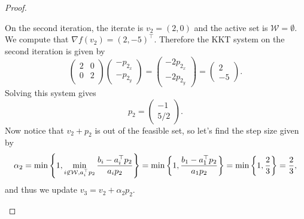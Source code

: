 \documentclass[12pt]{report}
\begin{document}
\begin{problem}
\begin{proof}
\begin{enumerate}
    On the second iteration, the iterate is $v_2 = (2,0)$ and the active set is $\mathcal{W} = \emptyset$. We compute that $\nabla f(v_2) = (2,-5)^\top$. Therefore the KKT system on the second iteration is given by
    \begin{equation*}
        \begin{pmatrix}
            2 & 0 \\
            0 & 2 \\
        \end{pmatrix}\begin{pmatrix}
            -p_{2_x}\\-p_{2_y}
        \end{pmatrix} = \begin{pmatrix}
            -2p_{2_x}\\-2p_{2_y}
        \end{pmatrix}= \begin{pmatrix}
            2 \\ -5
        \end{pmatrix}.
    \end{equation*}
    Solving this system gives
    \begin{equation*}
        p_2 = \begin{pmatrix}
            -1 \\ 5/2
        \end{pmatrix}.
    \end{equation*}
    Now notice that $v_2 + p_2$ is out of the feasible set, so let's find the step size given by
    \begin{equation*}
        \alpha_2 = \min{\left\{1,\min_{i\not\in\mathcal{W},a_i^\top p_2}\frac{b_i - a_i^\top p_2}{a_i p_2}\right\}} = \min{\left\{1,\frac{b_1 - a_1^\top p_2}{a_1 p_2}\right\}} = \min {\left\{1, \frac{2}{3}\right\}} = \frac{2}{3},
    \end{equation*} 
    and thus we update $v_3 = v_2 + \alpha_2 p_2$.


\end{enumerate}
\end{proof}
\end{problem}
\end{document}

